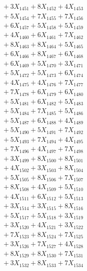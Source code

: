 \documentclass[a4paper,10pt]{article}
\begin{document}
{\begin{align}
&\;  + 3 X_{1451} + 8 X_{1452} + 4 X_{1453} \\[0.3ex]
&\;  + 5 X_{1454} + 7 X_{1455} + 7 X_{1456} \\[0.3ex]
&\;  + 6 X_{1457} + 5 X_{1458} + 5 X_{1459} \\[0.3ex]
&\;  + 4 X_{1460} + 6 X_{1461} + 7 X_{1462} \\[0.3ex]
&\;  + 8 X_{1463} + 8 X_{1464} + 5 X_{1465} \\[0.3ex]
&\;  + 6 X_{1466} + 8 X_{1467} + 6 X_{1468} \\[0.3ex]
&\;  + 6 X_{1469} + 5 X_{1470} + 3 X_{1471} \\[0.3ex]
&\;  + 5 X_{1472} + 5 X_{1473} + 6 X_{1474} \\[0.3ex]
&\;  + 4 X_{1475} + 4 X_{1476} + 7 X_{1477} \\[0.3ex]
&\;  + 7 X_{1478} + 6 X_{1479} + 6 X_{1480} \\[0.5ex]\allowbreak
&\;  + 5 X_{1481} + 6 X_{1482} + 5 X_{1483} \\[0.3ex]
&\;  + 5 X_{1484} + 7 X_{1485} + 5 X_{1486} \\[0.3ex]
&\;  + 5 X_{1487} + 6 X_{1488} + 4 X_{1489} \\[0.3ex]
&\;  + 5 X_{1490} + 5 X_{1491} + 7 X_{1492} \\[0.3ex]
&\;  + 5 X_{1493} + 7 X_{1494} + 4 X_{1495} \\[0.3ex]
&\;  + 7 X_{1496} + 4 X_{1497} + 7 X_{1498} \\[0.3ex]
&\;  + 3 X_{1499} + 8 X_{1500} + 8 X_{1501} \\[0.3ex]
&\;  + 4 X_{1502} + 3 X_{1503} + 8 X_{1504} \\[0.3ex]
&\;  + 5 X_{1505} + 8 X_{1506} + 7 X_{1507} \\[0.3ex]
&\;  + 8 X_{1508} + 4 X_{1509} + 5 X_{1510} \\[0.5ex]\allowbreak
&\;  + 4 X_{1511} + 6 X_{1512} + 5 X_{1513} \\[0.3ex]
&\;  + 3 X_{1514} + 3 X_{1515} + 8 X_{1516} \\[0.3ex]
&\;  + 5 X_{1517} + 5 X_{1518} + 3 X_{1519} \\[0.3ex]
&\;  + 3 X_{1520} + 4 X_{1521} + 3 X_{1522} \\[0.3ex]
&\;  + 7 X_{1523} + 8 X_{1524} + 7 X_{1525} \\[0.3ex]
&\;  + 3 X_{1526} + 7 X_{1527} + 4 X_{1528} \\[0.3ex]
&\;  + 8 X_{1529} + 8 X_{1530} + 7 X_{1531} \\[0.3ex]
&\;  + 3 X_{1532} + 8 X_{1533} + 7 X_{1534} \\[0.3ex]

\end{align}}
\end{document}
